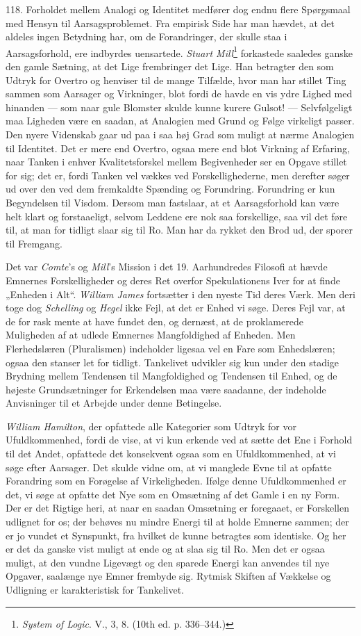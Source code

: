 \documentclass[12pt,a4paper]{book}
\newcommand{\apage}[1]{\marginnote{\footnotesize\textit{[#1]}}}
\begin{document}
118. Forholdet mellem Analogi og Identitet medfører dog endnu flere Spørgsmaal med
Hensyn til Aarsagsproblemet. Fra empirisk Side har man hævdet, at det aldeles ingen
Betydning har, om de Forandringer, der skulle staa i Aarsagsforhold, ere indbyrdes
uensartede. \emph{Stuart Mill}\footnote{\emph{System of Logic}. V., 3, 8. (10th ed.
p. 336--344.)} forkastede saaledes ganske den gamle Sætning, at det Lige frembringer
det Lige. Han betragter den som Udtryk for Overtro og henviser til de mange
Tilfælde, hvor man har stillet Ting sammen som Aarsager og Virkninger, blot fordi de
havde en vis ydre Lighed med hinanden --- som naar gule Blomster skulde kunne kurere
Gulsot! --- Selvfølgeligt maa Ligheden være en saadan, at Analogien med Grund og
Følge virkeligt passer. Den nyere Videnskab gaar ud paa i saa høj Grad som muligt at
nærme Analogien til Identitet. Det er mere end Overtro, ogsaa mere end blot Virkning
af Erfaring, naar Tanken i enhver Kvalitetsforskel mellem Begivenheder ser en Opgave
stillet for sig; det er, fordi Tanken vel vækkes ved Forskellighederne, men derefter
søger ud over den ved dem fremkaldte Spænding og Forundring. Forundring er kun
Begyndelsen til Visdom. Dersom man fastslaar, at et Aarsagsforhold kan være helt
klart og forstaaeligt, selvom Leddene ere nok saa forskellige, saa vil det føre til,
at man for tidligt slaar sig til Ro. Man har da rykket den Brod ud, der sporer til
Fremgang.

Det var \emph{Comte}'s og \emph{Mill}'s Mission i det 19. Aarhundredes Filosofi at
hævde Emnernes Forskelligheder og deres Ret overfor Spekulationens Iver for at finde
„Enheden i Alt“. \emph{William James} fortsætter i den nyeste Tid deres \apage{282} Værk. Men
deri toge dog \emph{Schelling} og \emph{Hegel} ikke Fejl, at det er Enhed vi søge.
Deres Fejl var, at de for rask mente at have fundet den, og dernæst, at de
proklamerede Muligheden af at udlede Emnernes Mangfoldighed af Enheden. Men
Flerhedslæren (Pluralismen) indeholder ligesaa vel en Fare som Enhedslæren; ogsaa
den stanser let for tidligt. Tankelivet udvikler sig kun under den stadige Brydning
mellem Tendensen til Mangfoldighed og Tendensen til Enhed, og de højeste
Grundsætninger for Erkendelsen maa være saadanne, der indeholde Anvisninger til et
Arbejde under denne Betingelse.

\emph{William Hamilton}, der opfattede alle Kategorier som Udtryk for vor
Ufuldkommenhed, fordi de vise, at vi kun erkende ved at sætte det Ene i Forhold til
det Andet, opfattede det konsekvent ogsaa som en Ufuldkommenhed, at vi søge efter
Aarsager. Det skulde vidne om, at vi manglede Evne til at opfatte Forandring som en
Forøgelse af Virkeligheden. Ifølge denne Ufuldkommenhed er det, vi søge at opfatte
det Nye som en Omsætning af det Gamle i en ny Form. Der er det Rigtige heri, at naar
en saadan Omsætning er foregaaet, er Forskellen udlignet for os; der behøves nu
mindre Energi til at holde Emnerne sammen; der er jo vundet et Synspunkt, fra
hvilket de kunne betragtes som identiske. Og her er det da ganske vist muligt at
ende og at slaa sig til Ro. Men det er ogsaa muligt, at den vundne Ligevægt og den
sparede Energi kan anvendes til nye Opgaver, saalænge nye Emner frembyde sig.
Rytmisk Skiften af Vækkelse og Udligning er karakteristisk for Tankelivet.
\end{document}
